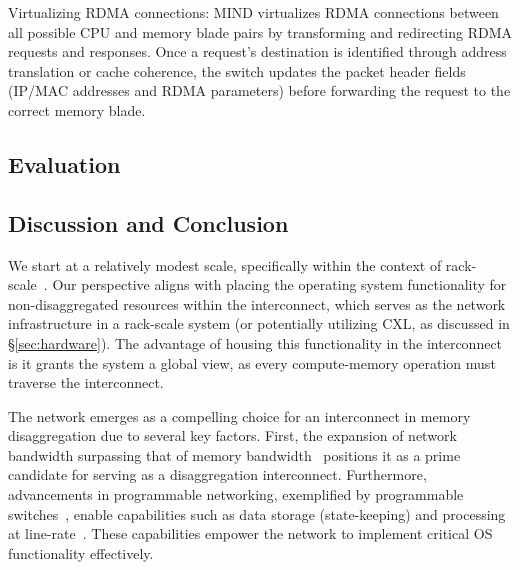 Virtualizing RDMA connections: MIND virtualizes RDMA connections between all possible CPU and memory blade pairs by transforming and redirecting RDMA requests and responses. Once a request’s destination is identified through address translation or cache coherence, the switch updates the packet header fields (IP/MAC addresses and RDMA parameters) before forwarding the request to the correct memory blade.


\subsection{Evaluation}
\subsection{Discussion and Conclusion}

We start at a relatively modest scale, specifically within the context of rack-scale~\cite{industry2, industry4}. Our perspective aligns with placing the operating system functionality for non-disaggregated resources within the interconnect, which serves as the network infrastructure in a rack-scale system (or potentially utilizing CXL, as discussed in \S\ref{sec:hardware}). The advantage of housing this functionality in the interconnect is it grants the system a global view, as every compute-memory operation must traverse the interconnect.


The network emerges as a compelling choice for an interconnect in memory disaggregation due to several key factors. First, the expansion of network bandwidth surpassing that of memory bandwidth~\cite{terabitethernet} positions it as a prime candidate for serving as a disaggregation interconnect. Furthermore, advancements in programmable networking, exemplified by programmable switches~\cite{progswitch1,progswitch2,progswitch3, progswitch4}, enable capabilities such as data storage (state-keeping) and processing at line-rate~\cite{pktsched}. These capabilities empower the network to implement critical OS functionality effectively.


